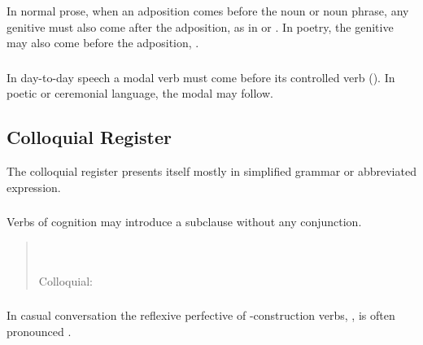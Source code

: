 \subsubsection{} In normal prose, when an adposition comes before the
noun or noun phrase, any genitive must also come after the adposition,
as in  or  .  In
poetry, the genitive may also come before the adposition, . 

\subsubsection{} In day-to-day speech a modal verb must come before
its controlled verb ().  In poetic or
ceremonial language, the modal may follow.


\subsection{Colloquial Register} The colloquial register presents
itself mostly in simplified grammar or abbreviated expression.

\subsubsection{} Verbs of cognition may introduce a subclause without
any conjunction.

\begin{quotation}
\noindent{}\\
\noindent{}\\
\noindent Colloquial: 
\end{quotation}

\subsubsection{} In casual conversation the reflexive perfective of
-construction verbs, , is often pronounced
.

